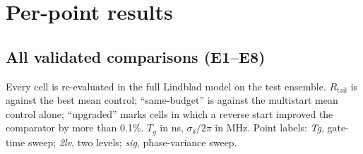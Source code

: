 \documentclass[aps,pra,onecolumn,notitlepage,superscriptaddress,nofootinbib,floatfix]{revtex4-2}
\newcommand{\Rt}{R_{\mathrm{tail}}}
\begin{document}
\section{Per-point results}
\label{sec:fulltable}
\subsection{All validated comparisons (E1--E8)}
Every cell is re-evaluated in the full Lindblad model on the test ensemble.
$\Rt$ is against the best mean control; ``same-budget'' is against the
multistart mean control alone; ``upgraded'' marks cells in which a reverse
start improved the comparator by more than 0.1\%. $T_g$ in ns,
$\sigma_\delta/2\pi$ in MHz. Point labels: \emph{Tg}, gate-time sweep;
\emph{2lv}, two levels; \emph{sig}, phase-variance sweep.
\begin{center}\scriptsize\setlength{\tabcolsep}{3pt}

\end{center}
\end{document}
